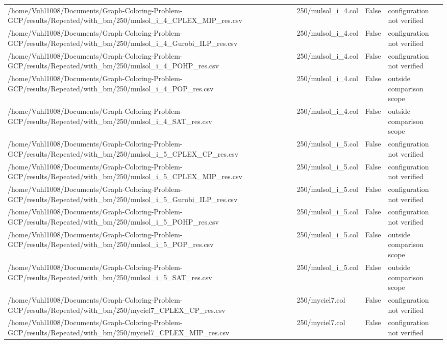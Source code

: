 \begin{table}[htbp]
\begin{tabular}{llll}
/home/Vuhl1008/Documents/Graph-Coloring-Problem-GCP/results/Repeated/with\_bm/250/mulsol\_i\_4\_CPLEX\_MIP\_res.csv & 250/mulsol\_i\_4.col & False & configuration not verified \\
/home/Vuhl1008/Documents/Graph-Coloring-Problem-GCP/results/Repeated/with\_bm/250/mulsol\_i\_4\_Gurobi\_ILP\_res.csv & 250/mulsol\_i\_4.col & False & configuration not verified \\
/home/Vuhl1008/Documents/Graph-Coloring-Problem-GCP/results/Repeated/with\_bm/250/mulsol\_i\_4\_POHP\_res.csv & 250/mulsol\_i\_4.col & False & configuration not verified \\
/home/Vuhl1008/Documents/Graph-Coloring-Problem-GCP/results/Repeated/with\_bm/250/mulsol\_i\_4\_POP\_res.csv & 250/mulsol\_i\_4.col & False & outside comparison scope \\
/home/Vuhl1008/Documents/Graph-Coloring-Problem-GCP/results/Repeated/with\_bm/250/mulsol\_i\_4\_SAT\_res.csv & 250/mulsol\_i\_4.col & False & outside comparison scope \\
/home/Vuhl1008/Documents/Graph-Coloring-Problem-GCP/results/Repeated/with\_bm/250/mulsol\_i\_5\_CPLEX\_CP\_res.csv & 250/mulsol\_i\_5.col & False & configuration not verified \\
/home/Vuhl1008/Documents/Graph-Coloring-Problem-GCP/results/Repeated/with\_bm/250/mulsol\_i\_5\_CPLEX\_MIP\_res.csv & 250/mulsol\_i\_5.col & False & configuration not verified \\
/home/Vuhl1008/Documents/Graph-Coloring-Problem-GCP/results/Repeated/with\_bm/250/mulsol\_i\_5\_Gurobi\_ILP\_res.csv & 250/mulsol\_i\_5.col & False & configuration not verified \\
/home/Vuhl1008/Documents/Graph-Coloring-Problem-GCP/results/Repeated/with\_bm/250/mulsol\_i\_5\_POHP\_res.csv & 250/mulsol\_i\_5.col & False & configuration not verified \\
/home/Vuhl1008/Documents/Graph-Coloring-Problem-GCP/results/Repeated/with\_bm/250/mulsol\_i\_5\_POP\_res.csv & 250/mulsol\_i\_5.col & False & outside comparison scope \\
/home/Vuhl1008/Documents/Graph-Coloring-Problem-GCP/results/Repeated/with\_bm/250/mulsol\_i\_5\_SAT\_res.csv & 250/mulsol\_i\_5.col & False & outside comparison scope \\
/home/Vuhl1008/Documents/Graph-Coloring-Problem-GCP/results/Repeated/with\_bm/250/myciel7\_CPLEX\_CP\_res.csv & 250/myciel7.col & False & configuration not verified \\
/home/Vuhl1008/Documents/Graph-Coloring-Problem-GCP/results/Repeated/with\_bm/250/myciel7\_CPLEX\_MIP\_res.csv & 250/myciel7.col & False & configuration not verified \\

\end{tabular}
\end{table}

